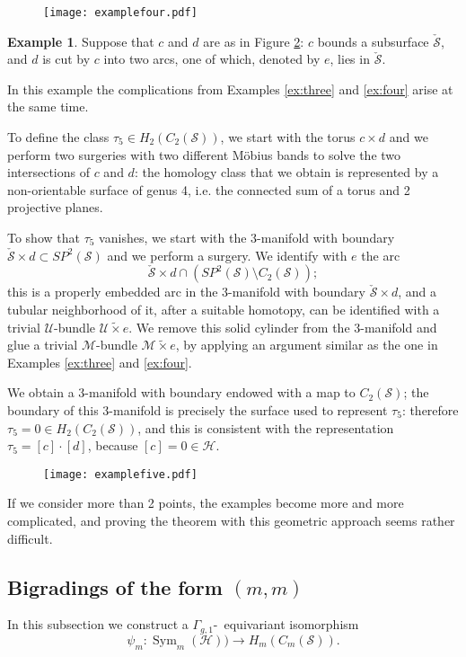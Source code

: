 \documentclass{amsart}
\theoremstyle{plain}
\theoremstyle{definition}
\newtheorem{ex}{Example}
\renewcommand{\H}{\mathcal{H}}
\newcommand{\M}{\mathcal{M}}
\renewcommand{\S}{\mathcal{S}}
\newcommand{\U}{\mathcal{U}}
\renewcommand{\gg}{\Gamma_{g,1}}
\newcommand{\cms}{C_m(\S)}
\newcommand{\pa}[1]{\left(#1\right)}
\newcommand{\SP}{S\!P}
\DeclareMathOperator{\Sym}{Sym}
\begin{document}
\begin{figure}[ht]\centering
 \texttt{[image: examplefour.pdf]}
 \caption{}
\label{fig:examplefour}
\end{figure}

\begin{ex}
 \label{ex:five}
 Suppose that $c$ and $d$ are as in Figure \ref{fig:examplefive}:
 $c$ bounds a subsurface $\check{\S}$, and $d$ is cut by $c$ into two arcs, one of which, denoted by $e$, lies
 in $\check{\S}$.
 
 In this example the complications from Examples \ref{ex:three} and \ref{ex:four} arise at the same time.
 
 To define the class $\tau_5\in H_2(C_2(\S))$, we start with the torus $c\times d$ and we perform two surgeries
 with two different M\"{o}bius bands to solve the two intersections of $c$ and $d$: the homology
 class that we obtain is represented by a non-orientable surface of genus 4, i.e. the connected
 sum of a torus and 2 projective planes.
 
 To show that $\tau_5$ vanishes, we start with the 3-manifold with boundary $\check{\S}\times d\subset\SP^2(\S)$ and we perform
 a surgery. We identify with $e$ the arc
 \[
  \check{\S}\times d\cap\pa{\SP^2(\S)\setminus C_2(\S)};
 \]
 this is a properly embedded arc in the 3-manifold with boundary $\check{\S}\times d$, and a tubular neighborhood
 of it, after a suitable homotopy, can be identified with a trivial $\U$-bundle $\U\tilde{\times} e$. We remove
 this solid cylinder from the 3-manifold and glue a trivial $\M$-bundle $\M\tilde{\times} e$, by applying an argument
 similar as the one in Examples \ref{ex:three} and \ref{ex:four}.
 
 We obtain a 3-manifold with boundary endowed with a map to $C_2(\S)$; the boundary of this 3-manifold
 is precisely the surface used to represent $\tau_5$: therefore $\tau_5=0\in H_2(C_2(\S))$,
 and this is consistent with the representation $\tau_5=[c]\cdot[d]$, because $[c]=0\in \H$.
\end{ex}

\begin{figure}[ht]\centering
 \texttt{[image: examplefive.pdf]}
 \caption{}
\label{fig:examplefive}
\end{figure}

If we consider more than 2 points, the examples become more and more complicated, and proving the theorem with this geometric
approach seems rather difficult.

\subsection{Bigradings of the form \texorpdfstring{$(m,m)$}{(m,m)}}
In this subsection we construct a $\gg$-~equivariant isomorphism 
\[
\psi_m\colon \Sym_m(\H))\to H_m(\cms).
\]
\end{document}
